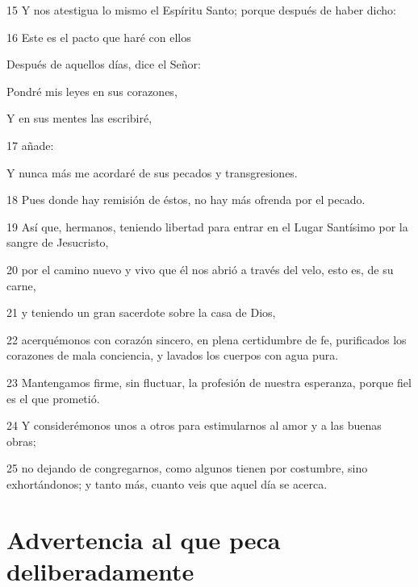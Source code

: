 \par 15 Y nos atestigua lo mismo el Espíritu Santo; porque después de haber dicho:
\par 16 Este es el pacto que haré con ellos
\par Después de aquellos días, dice el Señor:
\par Pondré mis leyes en sus corazones,
\par Y en sus mentes las escribiré,
\par 17 añade:
\par Y nunca más me acordaré de sus pecados y transgresiones.
\par 18 Pues donde hay remisión de éstos, no hay más ofrenda por el pecado.
\par 19 Así que, hermanos, teniendo libertad para entrar en el Lugar Santísimo por la sangre de Jesucristo,
\par 20 por el camino nuevo y vivo que él nos abrió a través del velo, esto es, de su carne,
\par 21 y teniendo un gran sacerdote sobre la casa de Dios,
\par 22 acerquémonos con corazón sincero, en plena certidumbre de fe, purificados los corazones de mala conciencia, y lavados los cuerpos con agua pura.
\par 23 Mantengamos firme, sin fluctuar, la profesión de nuestra esperanza, porque fiel es el que prometió.
\par 24 Y considerémonos unos a otros para estimularnos al amor y a las buenas obras;
\par 25 no dejando de congregarnos, como algunos tienen por costumbre, sino exhortándonos; y tanto más, cuanto veis que aquel día se acerca.

\section*{Advertencia al que peca deliberadamente}

